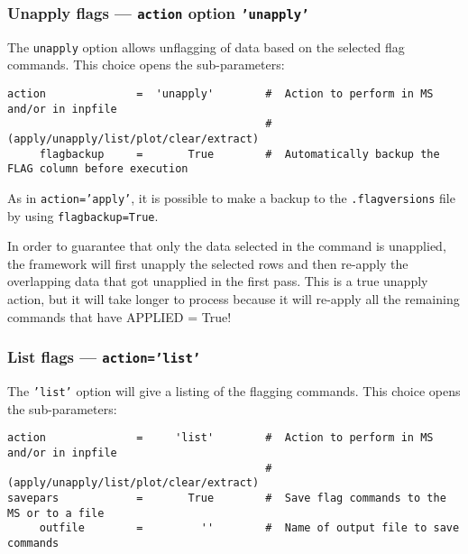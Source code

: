 \subsubsection{Unapply flags --- {\tt action} option {\tt 'unapply'}}
\label{section:edit.flagcmd.action.unapply}

The {\tt unapply} option allows unflagging of data based on the selected flag commands.
This choice opens the sub-parameters:
\small
\begin{verbatim}
action              =  'unapply'        #  Action to perform in MS and/or in inpfile
                                        #   (apply/unapply/list/plot/clear/extract)
     flagbackup     =       True        #  Automatically backup the FLAG column before execution

\end{verbatim}
\normalsize

As in {\tt action='apply'}, it is possible to make a backup to the
{\tt *.flagversions} file by using {\tt flagbackup=True}.  

In order to guarantee that only the data selected in the command is
unapplied, the framework will first unapply the selected rows and then
re-apply the overlapping data that got unapplied in the first
pass. This is a true unapply action, but it will take longer to
process because it will re-apply all the remaining commands that have
APPLIED = True!


%



\subsubsection{List flags --- {\tt action='list'}}
\label{section:edit.flagcmd.action.list}

The {\tt 'list'} option will give a listing of the flagging commands.
This choice opens the sub-parameters:
\small
\begin{verbatim}
action              =     'list'        #  Action to perform in MS and/or in inpfile
                                        # (apply/unapply/list/plot/clear/extract)
savepars            =       True        #  Save flag commands to the MS or to a file
     outfile        =         ''        #  Name of output file to save commands
\end{verbatim}
\normalsize

